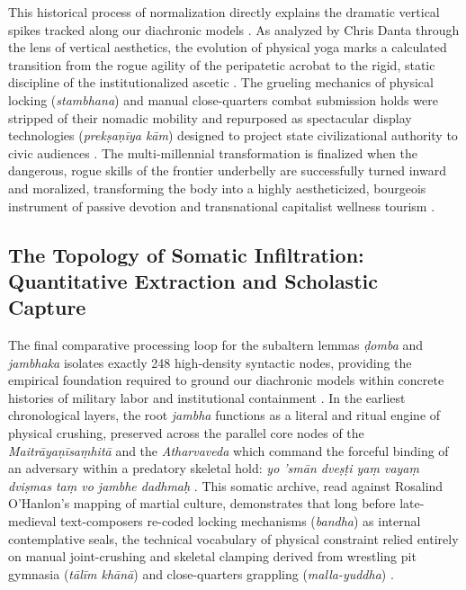 \documentclass[11pt,letterpaper]{article}
\begin{document}
This historical process of normalization directly explains the dramatic vertical spikes tracked along our diachronic models \cite{McCartney2026b}. As analyzed by Chris Danta through the lens of vertical aesthetics, the evolution of physical yoga marks a calculated transition from the rogue agility of the peripatetic acrobat to the rigid, static discipline of the institutionalized ascetic \cite{Danta2015}. The grueling mechanics of physical locking (\textit{stambhana}) and manual close-quarters combat submission holds were stripped of their nomadic mobility and repurposed as spectacular display technologies (\textit{prekṣaṇīya kām}) designed to project state civilizational authority to civic audiences \cite{Danta2015, McCartney2026b}. The multi-millennial transformation is finalized when the dangerous, rogue skills of the frontier underbelly are successfully turned inward and moralized, transforming the body into a highly aestheticized, bourgeois instrument of passive devotion and transnational capitalist wellness tourism \cite{McCartney2021, Srinivas2012}.


\subsection{The Topology of Somatic Infiltration: Quantitative Extraction and Scholastic Capture}

The final comparative processing loop for the subaltern lemmas \textit{ḍomba} and \textit{jambhaka} isolates exactly 248 high-density syntactic nodes, providing the empirical foundation required to ground our diachronic models within concrete histories of military labor and institutional containment \cite{Lorenzen1978, McCartney2026}. In the earliest chronological layers, the root \textit{jambha} functions as a literal and ritual engine of physical crushing, preserved across the parallel core nodes of the \textit{Maitrāyaṇīsaṃhitā} and the \textit{Atharvaveda} which command the forceful binding of an adversary within a predatory skeletal hold: \textit{yo 'smān dveṣṭi yaṃ vayaṃ dviṣmas taṃ vo jambhe dadhmaḥ} \cite{McCartney2026}. This somatic archive, read against Rosalind O'Hanlon's mapping of martial culture, demonstrates that long before late-medieval text-composers re-coded locking mechanisms (\textit{bandha}) as internal contemplative seals, the technical vocabulary of physical constraint relied entirely on manual joint-crushing and skeletal clamping derived from wrestling pit gymnasia (\textit{tālīm khānā}) and close-quarters grappling (\textit{malla-yuddha}) \cite{Birch2024, OHanlon2007}.
\end{document}
